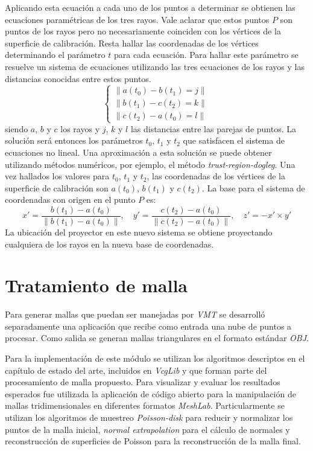Aplicando esta ecuación a cada uno de los puntos a determinar se obtienen las ecuaciones paramétricas de los tres rayos. Vale aclarar que estos puntos $P$ son puntos de los rayos pero no necesariamente coinciden con los vértices de la superficie de calibración. Resta hallar las coordenadas de los vértices determinando el parámetro $t$ para cada ecuación. Para hallar este parámetro se resuelve un sistema de ecuaciones utilizando las tres ecuaciones de los rayos y las distancias conocidas entre estos puntos.
\[
\begin{cases}
\lVert{a(t_0) - b(t_1)} = j\rVert \\
\lVert{b(t_1) - c(t_2)} = k\rVert \\
\lVert{c(t_2) - a(t_0)} = l\rVert
\end{cases}
\]
siendo $a$, $b$ y $c$ los rayos y $j$, $k$ y $l$ las distancias entre las parejas de puntos.
La solución será entonces los parámetros $t_0$, $t_1$ y $t_2$ que satisfacen el sistema de ecuaciones no lineal.
Una aproximación a esta solución se puede obtener utilizando métodos numéricos, por ejemplo, el método \emph{trust-region-dogleg}\cite{TrustRegionDogleg}.
Una vez hallados los valores para $t_0$, $t_1$ y $t_2$, las coordenadas de los vértices de la superficie de calibración son $a(t_0)$, $b(t_1)$ y $c(t_2)$.
La base para el sistema de coordenadas con origen en el punto $P$ es:
\[
x' = \frac{b(t_1) - a(t_0)}{\lVert b(t_1) - a(t_0) \rVert},\quad y' = \frac{c(t_2) - a(t_0)}{\lVert c(t_2) - a(t_0)\rVert},\quad z' = -x' \times y'
\]
La ubicación del proyector en este nuevo sistema se obtiene proyectando cualquiera de los rayos en la nueva base de coordenadas.

\section{Tratamiento de malla}

Para generar mallas que puedan ser manejadas por \emph{VMT} se desarrolló separadamente una aplicación que recibe como entrada una nube de puntos a procesar.
Como salida se generan mallas triangulares en el formato estándar \emph{OBJ}.

Para la implementación de este módulo se utilizan los algoritmos descriptos en el capítulo de estado del arte, incluidos en \emph{VcgLib} y que forman parte del procesamiento de malla propuesto. Para visualizar y evaluar los resultados esperados fue utilizada la aplicación de código abierto para la manipulación de mallas tridimensionales en diferentes formatos \emph{MeshLab}\cite{MeshLab}. Particularmente se utilizan los algoritmos de muestreo \emph{Poisson-disk} para reducir y normalizar los puntos de la malla inicial, \emph{normal extrapolation} para el cálculo de normales y reconstrucción de superficies de Poisson para la reconstrucción de la malla final.

